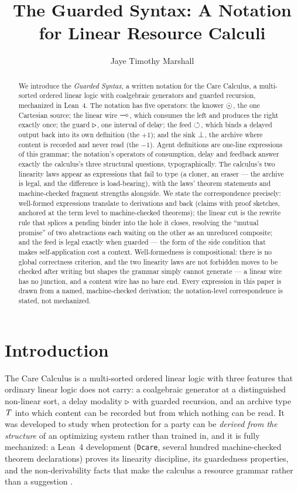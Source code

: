 \documentclass{eptcs}
\title{The Guarded Syntax: A Notation for Linear Resource Calculi}
\author{
  Jaye Timothy Marshall%
  \institute{Independent researcher\\
             {\footnotesize ORCID 0009-0002-5209-8161}}
}
\begin{document}
\maketitle
\begin{abstract}
We introduce the \emph{Guarded Syntax}, a written notation for the Care
Calculus, a multi-sorted ordered linear logic with coalgebraic
generators and guarded recursion, mechanized in Lean~4. The notation has
five operators: the knower $\odot$, the one Cartesian source; the
linear wire $\multimap$, which consumes the left and produces the right
exactly once; the guard $\triangleright$, one interval of delay; the feed
$\circlearrowleft$, which binds a delayed output back into its own definition (the
$+1$); and the sink $\bot$, the archive where content is recorded and
never read (the $-1$). Agent definitions are one-line expressions of
this grammar; the notation's operators of consumption, delay and
feedback answer exactly the calculus's three structural questions,
typographically.
The calculus's two linearity laws appear as expressions that fail to
type (a cloner, an eraser --- the archive is legal, and the difference
is load-bearing), with the laws' theorem statements and
machine-checked fragment strengths alongside. We state the
correspondence precisely: well-formed expressions translate to
derivations and back (claims with proof sketches, anchored at the term
level to machine-checked theorems); the linear cut is the rewrite rule
that splices a pending binder into the hole it closes, resolving the
``mutual promise'' of two abstractions each waiting on the other as an
unreduced composite; and the feed is legal exactly when guarded --- the
form of the side condition that makes self-application cost a context.
Well-formedness is compositional: there is no global correctness
criterion, and the two linearity laws are not forbidden moves to be
checked after writing but shapes the grammar simply cannot generate ---
a linear wire has no junction, and a content wire has no bare end.
Every expression in this paper is drawn from a
named, machine-checked derivation; the notation-level correspondence is
stated, not mechanized.
\end{abstract}

\section{Introduction}\label{sec:intro}

The Care Calculus is a multi-sorted ordered linear logic with three
features that ordinary linear logic does not carry: a coalgebraic
generator at a distinguished non-linear sort, a delay modality $\triangleright$
with guarded recursion, and an archive type $\mathit{T}$ into which content can
be recorded but from which nothing can be read. It was developed to study
when protection for a party can be \emph{derived from the structure} of an
optimizing system rather than trained in, and it is fully mechanized: a
Lean~4 development (\texttt{Dcare}, several hundred machine-checked
theorem declarations) proves its linearity discipline, its guardedness
properties, and the non-derivability facts that make the calculus a
resource grammar rather than a suggestion \cite{dcarecompanion}.
\end{document}
